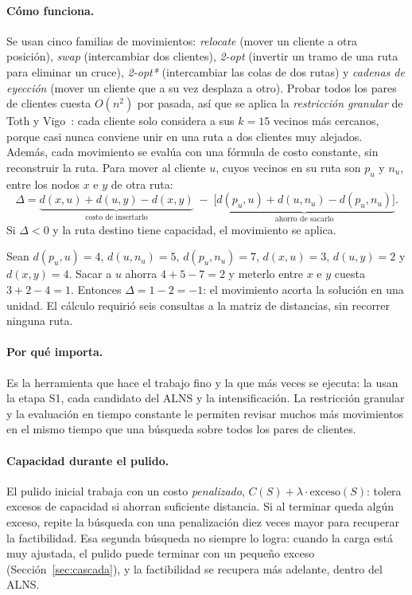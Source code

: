 \documentclass[11pt,a4paper]{article}
\begin{document}
\paragraph{Cómo funciona.} Se usan cinco familias de movimientos: \emph{relocate} (mover un cliente a
otra posición), \emph{swap} (intercambiar dos clientes), \emph{2-opt} (invertir un tramo de una
ruta para eliminar un cruce), \emph{2-opt*} (intercambiar las colas de dos rutas) y \emph{cadenas de
eyección} (mover un cliente que a su vez desplaza a otro). Probar todos los pares de clientes
cuesta $O(n^2)$ por pasada, así que se aplica la \emph{restricción granular} de Toth y
Vigo~\cite{toth2003granular}: cada cliente solo considera a sus $k=15$ vecinos más cercanos, porque
casi nunca conviene unir en una ruta a dos clientes muy alejados. Además, cada movimiento se evalúa
con una fórmula de costo constante, sin reconstruir la ruta. Para mover al cliente $u$, cuyos
vecinos en su ruta son $p_u$ y $n_u$, entre los nodos $x$ e $y$ de otra ruta:
\begin{equation}
\Delta = \underbrace{d(x,u)+d(u,y)-d(x,y)}_{\text{costo de insertarlo}}\;-\;
\underbrace{\bigl[d(p_u,u)+d(u,n_u)-d(p_u,n_u)\bigr]}_{\text{ahorro de sacarlo}}.
\label{eq:relocate}
\end{equation}
Si $\Delta<0$ y la ruta destino tiene capacidad, el movimiento se aplica.

\begin{ejemplo}
Sean $d(p_u,u)=4$, $d(u,n_u)=5$, $d(p_u,n_u)=7$, $d(x,u)=3$, $d(u,y)=2$ y $d(x,y)=4$. Sacar a $u$
ahorra $4+5-7=2$ y meterlo entre $x$ e $y$ cuesta $3+2-4=1$. Entonces $\Delta=1-2=-1$: el movimiento
acorta la solución en una unidad. El cálculo requirió seis consultas a la matriz de distancias, sin
recorrer ninguna ruta.
\end{ejemplo}

\paragraph{Por qué importa.} Es la herramienta que hace el trabajo fino y la que más veces se
ejecuta: la usan la etapa S1, cada candidato del ALNS y la intensificación. La restricción granular
y la evaluación en tiempo constante le permiten revisar muchos más movimientos en el mismo tiempo
que una búsqueda sobre todos los pares de clientes.

\paragraph{Capacidad durante el pulido.} El pulido inicial trabaja con un costo \emph{penalizado},
$C(S)+\lambda\cdot\text{exceso}(S)$: tolera excesos de capacidad si ahorran suficiente distancia. Si
al terminar queda algún exceso, repite la búsqueda con una penalización diez veces mayor para
recuperar la factibilidad. Esa segunda búsqueda no siempre lo logra: cuando la carga está muy
ajustada, el pulido puede terminar con un pequeño exceso (Sección~\ref{sec:cascada}), y la
factibilidad se recupera más adelante, dentro del ALNS.
\end{document}

